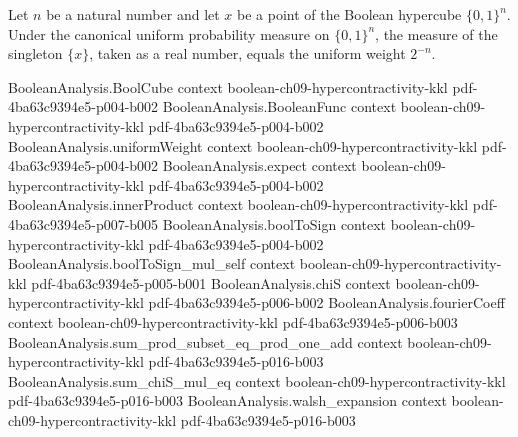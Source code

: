 \begin{lemma}
\label{BooleanAnalysis.Hypercontractivity.uniformMeasure_apply}
\leanok
{}
Let $n$ be a natural number and let $x$ be a point of the Boolean hypercube $\{0,1\}^n$.
Under the canonical uniform probability measure on $\{0,1\}^n$, the measure of the
singleton $\{x\}$, taken as a real number, equals the uniform weight $2^{-n}$.
\end{lemma}

\begin{lemma}
\label{BooleanAnalysis.Hypercontractivity.bonami_lemma}
\leanok
{}
\proofstep
  {BooleanAnalysis.BoolCube}
  {context}
  {boolean-ch09-hypercontractivity-kkl}
  {pdf-4ba63c9394e5-p004-b002}
\proofstep
  {BooleanAnalysis.BooleanFunc}
  {context}
  {boolean-ch09-hypercontractivity-kkl}
  {pdf-4ba63c9394e5-p004-b002}
\proofstep
  {BooleanAnalysis.uniformWeight}
  {context}
  {boolean-ch09-hypercontractivity-kkl}
  {pdf-4ba63c9394e5-p004-b002}
\proofstep
  {BooleanAnalysis.expect}
  {context}
  {boolean-ch09-hypercontractivity-kkl}
  {pdf-4ba63c9394e5-p004-b002}
\proofstep
  {BooleanAnalysis.innerProduct}
  {context}
  {boolean-ch09-hypercontractivity-kkl}
  {pdf-4ba63c9394e5-p007-b005}
\proofstep
  {BooleanAnalysis.boolToSign}
  {context}
  {boolean-ch09-hypercontractivity-kkl}
  {pdf-4ba63c9394e5-p004-b002}
\proofstep
  {BooleanAnalysis.boolToSign_mul_self}
  {context}
  {boolean-ch09-hypercontractivity-kkl}
  {pdf-4ba63c9394e5-p005-b001}
\proofstep
  {BooleanAnalysis.chiS}
  {context}
  {boolean-ch09-hypercontractivity-kkl}
  {pdf-4ba63c9394e5-p006-b002}
\proofstep
  {BooleanAnalysis.fourierCoeff}
  {context}
  {boolean-ch09-hypercontractivity-kkl}
  {pdf-4ba63c9394e5-p006-b003}
\proofstep
  {BooleanAnalysis.sum_prod_subset_eq_prod_one_add}
  {context}
  {boolean-ch09-hypercontractivity-kkl}
  {pdf-4ba63c9394e5-p016-b003}
\proofstep
  {BooleanAnalysis.sum_chiS_mul_eq}
  {context}
  {boolean-ch09-hypercontractivity-kkl}
  {pdf-4ba63c9394e5-p016-b003}
\proofstep
  {BooleanAnalysis.walsh_expansion}
  {context}
  {boolean-ch09-hypercontractivity-kkl}
  {pdf-4ba63c9394e5-p016-b003}

\end{lemma}
